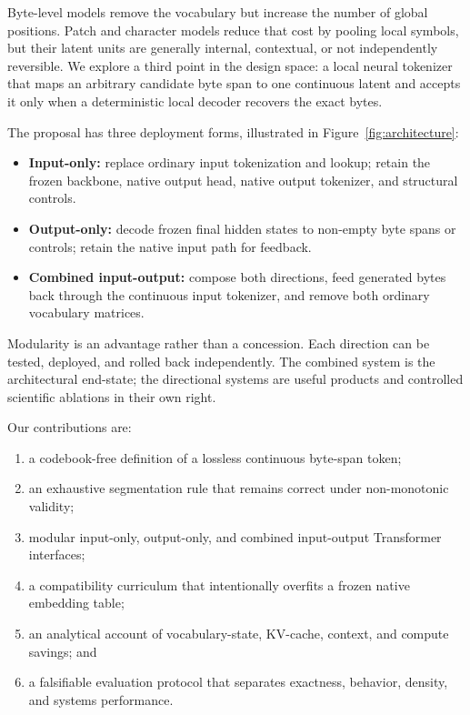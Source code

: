 \documentclass[10pt,twocolumn]{article}
\begin{document}
Byte-level models remove the vocabulary but increase the number of global positions. Patch and
character models reduce that cost by pooling local symbols, but their latent units are generally
internal, contextual, or not independently reversible. We explore a third point in the design
space: a local neural tokenizer that maps an arbitrary candidate byte span to one continuous
latent and accepts it only when a deterministic local decoder recovers the exact bytes.

The proposal has three deployment forms, illustrated in Figure~\ref{fig:architecture}:

\begin{itemize}
  \item \textbf{Input-only:} replace ordinary input tokenization and lookup; retain the frozen
  backbone, native output head, native output tokenizer, and structural controls.
  \item \textbf{Output-only:} decode frozen final hidden states to non-empty byte spans or
  controls; retain the native input path for feedback.
  \item \textbf{Combined input-output:} compose both directions, feed generated bytes back through
  the continuous input tokenizer, and remove both ordinary vocabulary matrices.
\end{itemize}

Modularity is an advantage rather than a concession. Each direction can be tested, deployed, and
rolled back independently. The combined system is the architectural end-state; the directional
systems are useful products and controlled scientific ablations in their own right.

Our contributions are:

\begin{enumerate}
  \item a codebook-free definition of a lossless continuous byte-span token;
  \item an exhaustive segmentation rule that remains correct under non-monotonic validity;
  \item modular input-only, output-only, and combined input-output Transformer interfaces;
  \item a compatibility curriculum that intentionally overfits a frozen native embedding table;
  \item an analytical account of vocabulary-state, KV-cache, context, and compute savings; and
  \item a falsifiable evaluation protocol that separates exactness, behavior, density, and systems
  performance.
\end{enumerate}
\end{document}
